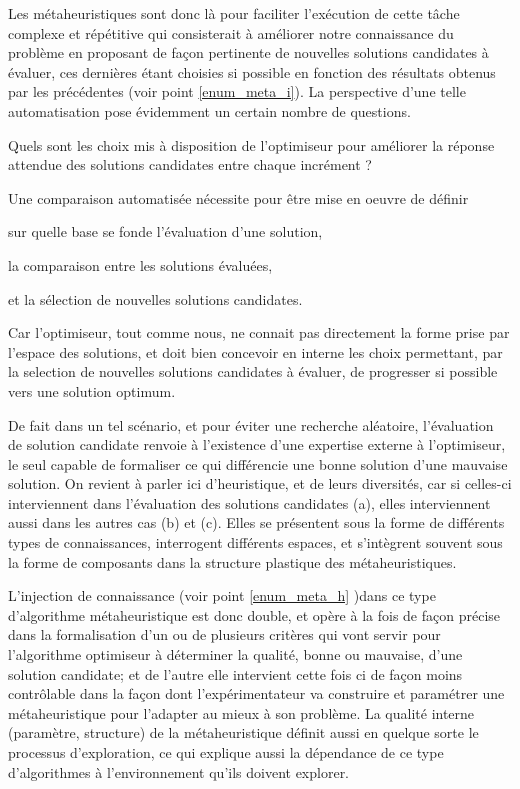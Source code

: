 Les métaheuristiques sont donc là pour faciliter l'exécution de cette tâche complexe et répétitive qui consisterait à améliorer notre connaissance du problème en proposant de façon pertinente de nouvelles solutions candidates à évaluer, ces dernières étant choisies si possible en fonction des résultats obtenus par les précédentes (voir point \ref{enum_meta_i}). La perspective d'une telle automatisation pose évidemment un certain nombre de questions.

Quels sont les choix mis à disposition de l'optimiseur pour améliorer la réponse attendue des solutions candidates entre chaque incrément ? \autocite[19]{Weise2011}

Une comparaison automatisée nécessite pour être mise en oeuvre de définir \begin{enumerate*}[label=(\alph*)]
\item sur quelle base se fonde l'évaluation d'une solution,
\item la comparaison entre les solutions évaluées,
\item et la sélection de nouvelles solutions candidates.\end{enumerate*} Car l'optimiseur, tout comme nous, ne connait pas directement la forme prise par l'espace des solutions, et doit bien concevoir en interne les choix permettant, par la selection de nouvelles solutions candidates à évaluer, de progresser si possible vers une solution optimum.

De fait dans un tel scénario, et pour éviter une recherche aléatoire, l'évaluation de solution candidate renvoie à l'existence d'une expertise externe à l'optimiseur, le seul capable de formaliser ce qui différencie une bonne solution d'une mauvaise solution. On revient à parler ici d'heuristique, et de leurs diversités, car si celles-ci interviennent dans l'évaluation des solutions candidates (a), elles interviennent aussi dans les autres cas (b) et (c). Elles se présentent sous la forme de différents types de connaissances, interrogent différents espaces, et s'intègrent souvent sous la forme de composants dans la structure plastique des métaheuristiques.

L'injection de connaissance (voir point \ref{enum_meta_h} )dans ce type d'algorithme métaheuristique est donc double, et opère à la fois de façon précise dans la formalisation d'un ou de plusieurs critères qui vont servir pour l'algorithme optimiseur à déterminer la qualité, bonne ou mauvaise, d'une solution candidate; et de l'autre elle intervient cette fois ci de façon moins contrôlable dans la façon dont l'expérimentateur va construire et paramétrer une métaheuristique pour l'adapter au mieux à son problème. La qualité interne (paramètre, structure) de la métaheuristique définit aussi en quelque sorte le processus d'exploration, ce qui explique aussi la dépendance de ce type d'algorithmes à l'environnement qu'ils doivent explorer.

